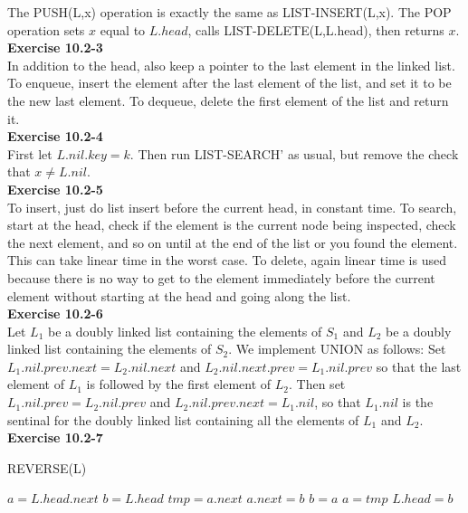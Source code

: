 \documentclass{article}
\begin{document}
The PUSH(L,x) operation is exactly the same as LIST-INSERT(L,x).  The POP operation sets $x$ equal to $L.head$, calls LIST-DELETE(L,L.head), then returns $x$. \\


\noindent\textbf{ Exercise 10.2-3} \\

In addition to the head, also keep a pointer to the last element in the linked list. To enqueue, insert the element after the last element of the list, and set it to be the new last element. To dequeue, delete the first element of the list and return it.\\

\noindent\textbf{Exercise 10.2-4}\\

First let $L.nil.key = k$.  Then run LIST-SEARCH' as usual, but remove the check that $x \neq L.nil$. \\

\noindent\textbf{ Exercise 10.2-5} \\

To insert, just do list insert before the current head, in constant time. To search, start at the head, check if the element is the current node being inspected, check the next element, and so on until at the end of the list or you found the element. This can take linear time in the worst case. To delete, again linear time is used because there is no way to get to the element immediately before the current element without starting at the head and going along the list.\\

\noindent\textbf{Exercise 10.2-6}\\

Let $L_1$ be a doubly linked list containing the elements of $S_1$ and $L_2$ be a doubly linked list containing the elements of $S_2$.  We implement UNION as follows: Set $L_1.nil.prev.next = L_2.nil.next$ and $L_2.nil.next.prev = L_1.nil.prev$ so that the last element of $L_1$ is followed by the first element of $L_2$.  Then set $L_1.nil.prev = L_2.nil.prev$ and $L_2.nil.prev.next = L_1.nil$, so that $L_1.nil$ is the sentinal for the doubly linked list containing all the elements of $L_1$ and $L_2$. \\

\noindent\textbf{ Exercise 10.2-7} \\

\begin{algorithm}
\caption{REVERSE(L)}
\begin{algorithmic}
\State $a = L.head.next$
\State $b = L.head$
\State $tmp = a.next$
\State $a.next = b$
\State $b = a$
\State $a= tmp$
\EndWhile
\State $L.head  = b$
\end{algorithmic}
\end{algorithm}
\end{document}
